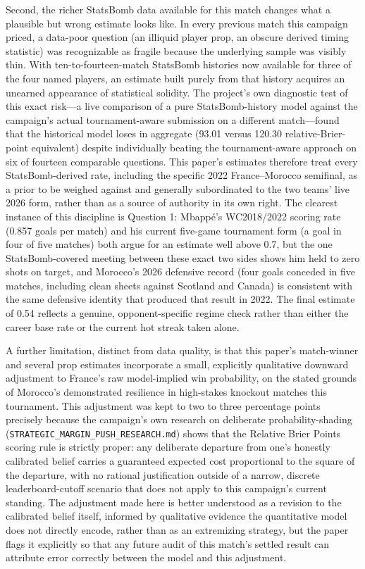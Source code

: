 \documentclass[11pt]{article}
\begin{document}
Second, the richer StatsBomb data available for this match changes what a plausible but
wrong estimate looks like. In every previous match this campaign priced, a data-poor
question (an illiquid player prop, an obscure derived timing statistic) was recognizable
as fragile because the underlying sample was visibly thin. With ten-to-fourteen-match
StatsBomb histories now available for three of the four named players, an estimate built
purely from that history acquires an unearned appearance of statistical solidity. The
project's own diagnostic test of this exact risk---a live comparison of a pure
StatsBomb-history model against the campaign's actual tournament-aware submission on a
different match---found that the historical model loses in aggregate (93.01 versus
120.30 relative-Brier-point equivalent) despite individually beating the tournament-aware
approach on six of fourteen comparable questions. This paper's estimates therefore treat
every StatsBomb-derived rate, including the specific 2022 France--Morocco semifinal, as a
prior to be weighed against and generally subordinated to the two teams' live
2026 form, rather than as a source of authority in its own right. The clearest instance of
this discipline is Question 1: Mbapp\'e's WC2018/2022 scoring rate (0.857 goals per match)
and his current five-game tournament form (a goal in four of five matches) both argue for
an estimate well above 0.7, but the one StatsBomb-covered meeting between these exact two
sides shows him held to zero shots on target, and Morocco's 2026 defensive record (four
goals conceded in five matches, including clean sheets against Scotland and Canada) is
consistent with the same defensive identity that produced that result in 2022. The final
estimate of 0.54 reflects a genuine, opponent-specific regime check rather than either the
career base rate or the current hot streak taken alone.

A further limitation, distinct from data quality, is that this paper's match-winner and
several prop estimates incorporate a small, explicitly qualitative downward adjustment to
France's raw model-implied win probability, on the stated grounds of Morocco's demonstrated
resilience in high-stakes knockout matches this tournament. This adjustment was kept to two
to three percentage points precisely because the campaign's own research on deliberate
probability-shading (\texttt{STRATEGIC\_MARGIN\_PUSH\_RESEARCH.md}) shows that the Relative
Brier Points scoring rule is strictly proper: any deliberate departure from one's honestly
calibrated belief carries a guaranteed expected cost proportional to the square of the
departure, with no rational justification outside of a narrow, discrete leaderboard-cutoff
scenario that does not apply to this campaign's current standing. The adjustment made here
is better understood as a revision to the calibrated belief itself, informed by qualitative
evidence the quantitative model does not directly encode, rather than as an extremizing
strategy, but the paper flags it explicitly so that any future audit of this match's
settled result can attribute error correctly between the model and this adjustment.
\end{document}
